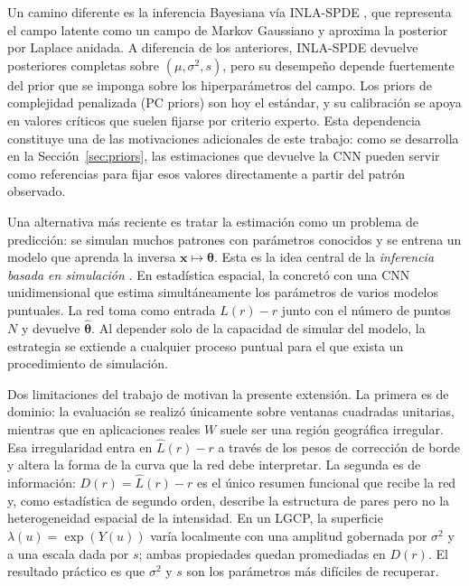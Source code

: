 \documentclass[a4paper,fleqn]{cas-sc}
\numberwithin{equation}{section}
\begin{document}
Un camino diferente es la inferencia Bayesiana v\'ia INLA-SPDE
\citep{Rue2009,toolboxINLA}, que representa el campo latente como un
campo de Markov Gaussiano y aproxima la posterior por Laplace anidada.
A diferencia de los anteriores, INLA-SPDE devuelve posteriores completas
sobre $(\mu,\sigma^2,s)$, pero su desempe\~no depende fuertemente del
prior que se imponga sobre los hiperpar\'ametros del campo. Los priors de
complejidad penalizada (PC priors) \citep{simpson2017penalising,
fuglstad2019constructing} son hoy el est\'andar, y su calibraci\'on se
apoya en valores cr\'iticos que suelen fijarse por criterio experto. Esta
dependencia constituye una de las motivaciones adicionales de este
trabajo: como se desarrolla en la Secci\'on~\ref{sec:priors}, las
estimaciones que devuelve la CNN pueden servir como referencias para
fijar esos valores directamente a partir del patr\'on observado.

Una alternativa m\'as reciente es tratar la estimaci\'on como un problema de predicci\'on: se simulan muchos patrones con par\'ametros conocidos y se
entrena un modelo que aprenda la inversa  $\mathbf{x}\mapsto\boldsymbol{\theta}$.
Esta es la idea central de la \emph{inferencia basada en simulaci\'on}
\citep{Cranmer2020}. En estad\'istica espacial, \citet{VIHRS2022} la concret\'o
con una CNN unidimensional que estima simult\'aneamente los par\'ametros de
varios modelos puntuales. La red toma como entrada $\hat{L}(r)-r$ junto con
el n\'umero de puntos $N$ y devuelve $\hat{\boldsymbol{\theta}}$. Al depender solo de la capacidad de simular del modelo, la estrategia se extiende a cualquier proceso puntual para el que exista un procedimiento de simulaci\'on.

Dos limitaciones del trabajo de \citet{VIHRS2022} motivan la presente
extensi\'on. La primera es de dominio: la evaluaci\'on se realiz\'o
\'unicamente sobre ventanas cuadradas unitarias, mientras que en
aplicaciones reales $W$ suele ser una regi\'on geogr\'afica irregular. Esa
irregularidad entra en $\hat{L}(r)-r$ a trav\'es de los pesos de
correcci\'on de borde y altera la forma de la curva que la red debe
interpretar. La segunda es de informaci\'on: $D(r)=\hat{L}(r)-r$ es el
\'unico resumen funcional que recibe la red y, como estad\'istica de
segundo orden, describe la estructura de pares pero no la heterogeneidad
espacial de la intensidad. En un LGCP, la superficie
$\lambda(u)=\exp(Y(u))$ var\'ia localmente con una amplitud gobernada por
$\sigma^2$ y a una escala dada por $s$; ambas propiedades quedan
promediadas en $D(r)$. El resultado pr\'actico es que $\sigma^2$ y $s$
son los par\'ametros m\'as dif\'iciles de recuperar.
\end{document}
